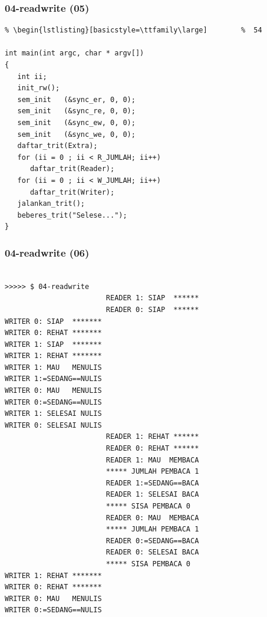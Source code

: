 \documentclass[aspectratio=169, xcolor=table, notheorems, hyperref={pdfpagelabels=false}]{beamer}
\begin{document}
\begin{frame}[fragile]
\frametitle{04-readwrite (05)}
\begin{lstlisting}[basicstyle=\ttfamily\footnotesize] %  72
% \begin{lstlisting}[basicstyle=\ttfamily\small]        %  65
% \begin{lstlisting}[basicstyle=\ttfamily\large]        %  54

int main(int argc, char * argv[])
{
   int ii;
   init_rw();
   sem_init   (&sync_er, 0, 0);
   sem_init   (&sync_re, 0, 0);
   sem_init   (&sync_ew, 0, 0);
   sem_init   (&sync_we, 0, 0);
   daftar_trit(Extra);
   for (ii = 0 ; ii < R_JUMLAH; ii++)
      daftar_trit(Reader);
   for (ii = 0 ; ii < W_JUMLAH; ii++)
      daftar_trit(Writer);
   jalankan_trit();
   beberes_trit("Selese...");
}

\end{lstlisting}
\end{frame}

\begin{frame}[fragile]
\frametitle{04-readwrite (06)}
\begin{lstlisting}[basicstyle=\ttfamily\tiny]

>>>>> $ 04-readwrite 
                        READER 1: SIAP  ******
                        READER 0: SIAP  ******
WRITER 0: SIAP  *******
WRITER 0: REHAT *******
WRITER 1: SIAP  *******
WRITER 1: REHAT *******
WRITER 1: MAU   MENULIS
WRITER 1:=SEDANG==NULIS
WRITER 0: MAU   MENULIS
WRITER 0:=SEDANG==NULIS
WRITER 1: SELESAI NULIS
WRITER 0: SELESAI NULIS
                        READER 1: REHAT ******
                        READER 0: REHAT ******
                        READER 1: MAU  MEMBACA
                        ***** JUMLAH PEMBACA 1
                        READER 1:=SEDANG==BACA
                        READER 1: SELESAI BACA
                        ***** SISA PEMBACA 0
                        READER 0: MAU  MEMBACA
                        ***** JUMLAH PEMBACA 1
                        READER 0:=SEDANG==BACA
                        READER 0: SELESAI BACA
                        ***** SISA PEMBACA 0
WRITER 1: REHAT *******
WRITER 0: REHAT *******
WRITER 0: MAU   MENULIS
WRITER 0:=SEDANG==NULIS

\end{lstlisting}
\end{frame}
\end{document}

